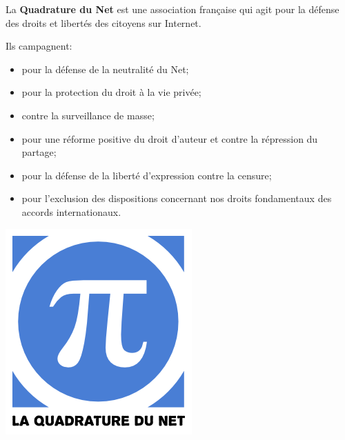 \documentclass[12pt]{../fiche}
\begin{document}
\begin{minipage}{0.65\textwidth}
    La \textbf{Quadrature du Net} est une association française qui
agit pour la défense des droits et libertés des citoyens sur Internet.

Ils campagnent:
\begin{itemize}
\item pour la défense de la neutralité du Net;
\item pour la protection du droit à la vie privée;
\item contre la surveillance de masse;
\item pour une réforme positive du droit d'auteur et contre la répression
du partage;
\item pour la défense de la liberté d'expression contre la censure;
\item pour l'exclusion des dispositions concernant nos droits fondamentaux
des accords internationaux.
\end{itemize}
\end{minipage}
\hfill
\begin{minipage}{0.25\textwidth}
\includegraphics[width=\linewidth]{quadraturenet.png}
\end{minipage}
\bigskip
\end{document}

